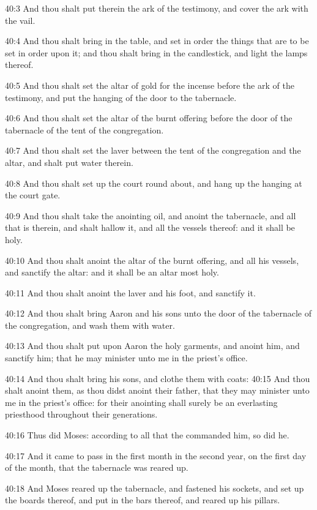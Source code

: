 40:3 And thou shalt put therein the ark of the testimony, and cover the ark with the vail.

40:4 And thou shalt bring in the table, and set in order the things that are to be set in order upon it; and thou shalt bring in the candlestick, and light the lamps thereof.

40:5 And thou shalt set the altar of gold for the incense before the ark of the testimony, and put the hanging of the door to the tabernacle.

40:6 And thou shalt set the altar of the burnt offering before the door of the tabernacle of the tent of the congregation.

40:7 And thou shalt set the laver between the tent of the congregation and the altar, and shalt put water therein.

40:8 And thou shalt set up the court round about, and hang up the hanging at the court gate.

40:9 And thou shalt take the anointing oil, and anoint the tabernacle, and all that is therein, and shalt hallow it, and all the vessels thereof: and it shall be holy.

40:10 And thou shalt anoint the altar of the burnt offering, and all his vessels, and sanctify the altar: and it shall be an altar most holy.

40:11 And thou shalt anoint the laver and his foot, and sanctify it.

40:12 And thou shalt bring Aaron and his sons unto the door of the tabernacle of the congregation, and wash them with water.

40:13 And thou shalt put upon Aaron the holy garments, and anoint him, and sanctify him; that he may minister unto me in the priest's office.

40:14 And thou shalt bring his sons, and clothe them with coats: 40:15 And thou shalt anoint them, as thou didst anoint their father, that they may minister unto me in the priest's office: for their anointing shall surely be an everlasting priesthood throughout their generations.

40:16 Thus did Moses: according to all that the \LORD commanded him, so did he.

40:17 And it came to pass in the first month in the second year, on the first day of the month, that the tabernacle was reared up.

40:18 And Moses reared up the tabernacle, and fastened his sockets, and set up the boards thereof, and put in the bars thereof, and reared up his pillars.

